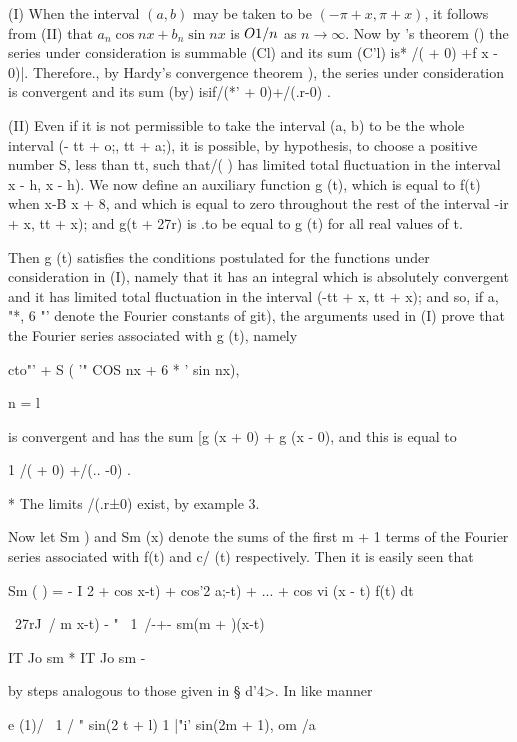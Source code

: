 (I) When the interval $(a, b)$ may be taken to be $(-\pi + x, \pi + x)$,
it follows from (II) %
that $a_{n} \cos nx + b_{n} \sin nx$ is $O{1/n}$ as
$n \rightarrow \infty$. Now by \Fejer's theorem ()
the series under consideration
is summable (Cl) %
and its sum (C'l) %
is* /( + 0) +f x - 0)|. Therefore.,
by Hardy's convergence theorem ), the series under consideration
is convergent and its sum (by) isif/(*' + 0)+/(.r-0) .

(II) Even if it is not permissible to take the interval (a, b) to be
the whole interval (- tt + o;, tt + a;), it is possible, by
hypothesis, to choose a positive number S, less than tt, such that/( )
has limited total fluctuation in the interval x - h, x - h). We now
define an auxiliary function g (t), which is equal to f(t) when x-B%
x + 8, and which is equal to zero throughout the rest of the interval
-ir + x, tt + x); and g(t + 27r) is .to be equal to g (t) for all real
values of t.

Then g (t) satisfies the conditions postulated for the functions under
consideration in (I), namely that it has an integral which is
absolutely convergent and it has limited total fluctuation in the
interval (-tt + x, tt + x); and so, if a, "*, 6 "' denote the Fourier
constants of git), the arguments used in (I) prove that the Fourier
series associated with g (t), namely

  cto"' + S ( '" COS nx + 6 * ' sin nx),

n = l

is convergent and has the sum [g (x + 0) + g (x - 0), and this is
equal to

1 /( + 0) +/(.. -0) .

* The limits /(.r±0) exist, by example 3.

%
%

Now let Sm ) and Sm (x) denote the sums of the first m + 1 terms of
the Fourier series associated with f(t) and c/ (t) respectively. Then
it is easily seen that

Sm ( ) = - I 2 + cos x-t) + cos'2 a;-t) + ... + cos vi (x - t) f(t) dt

~27rJ\ / m x-t) - " \ 1\ /-+- sm(m + )(x-t)

IT Jo sm * IT Jo sm -

by steps analogous to those given in § d'4>. In like manner

e (1)/ \ 1 / " sin(2 t + l) 1 |"i' sin(2m + 1), om /a


